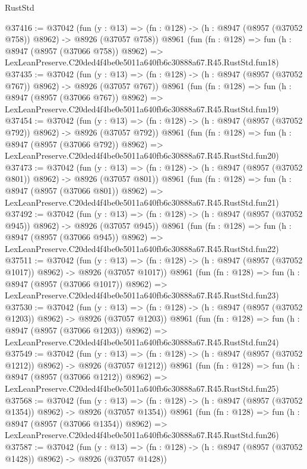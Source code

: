 \begin{lexlean}{RustStd}
\begin{coremodule}
@37416 := @37042
    (fun (y : @13) => (fn : @128) -> (h : @8947 (@8957 (@37052 @758)) @8962) -> @8926 (@37057 @758))
    @8961
    (fun (fn : @128) =>
    fun (h : @8947 (@8957 (@37066 @758)) @8962) =>
    LexLeanPreserve.C20ded4f4be0e5011a640fb6c30888a67.R45.RustStd.fun18)
@37435 := @37042
    (fun (y : @13) => (fn : @128) -> (h : @8947 (@8957 (@37052 @767)) @8962) -> @8926 (@37057 @767))
    @8961
    (fun (fn : @128) =>
    fun (h : @8947 (@8957 (@37066 @767)) @8962) =>
    LexLeanPreserve.C20ded4f4be0e5011a640fb6c30888a67.R45.RustStd.fun19)
@37454 := @37042
    (fun (y : @13) => (fn : @128) -> (h : @8947 (@8957 (@37052 @792)) @8962) -> @8926 (@37057 @792))
    @8961
    (fun (fn : @128) =>
    fun (h : @8947 (@8957 (@37066 @792)) @8962) =>
    LexLeanPreserve.C20ded4f4be0e5011a640fb6c30888a67.R45.RustStd.fun20)
@37473 := @37042
    (fun (y : @13) => (fn : @128) -> (h : @8947 (@8957 (@37052 @801)) @8962) -> @8926 (@37057 @801))
    @8961
    (fun (fn : @128) =>
    fun (h : @8947 (@8957 (@37066 @801)) @8962) =>
    LexLeanPreserve.C20ded4f4be0e5011a640fb6c30888a67.R45.RustStd.fun21)
@37492 := @37042
    (fun (y : @13) => (fn : @128) -> (h : @8947 (@8957 (@37052 @945)) @8962) -> @8926 (@37057 @945))
    @8961
    (fun (fn : @128) =>
    fun (h : @8947 (@8957 (@37066 @945)) @8962) =>
    LexLeanPreserve.C20ded4f4be0e5011a640fb6c30888a67.R45.RustStd.fun22)
@37511 := @37042
    (fun (y : @13) =>
    (fn : @128) -> (h : @8947 (@8957 (@37052 @1017)) @8962) -> @8926 (@37057 @1017))
    @8961
    (fun (fn : @128) =>
    fun (h : @8947 (@8957 (@37066 @1017)) @8962) =>
    LexLeanPreserve.C20ded4f4be0e5011a640fb6c30888a67.R45.RustStd.fun23)
@37530 := @37042
    (fun (y : @13) =>
    (fn : @128) -> (h : @8947 (@8957 (@37052 @1203)) @8962) -> @8926 (@37057 @1203))
    @8961
    (fun (fn : @128) =>
    fun (h : @8947 (@8957 (@37066 @1203)) @8962) =>
    LexLeanPreserve.C20ded4f4be0e5011a640fb6c30888a67.R45.RustStd.fun24)
@37549 := @37042
    (fun (y : @13) =>
    (fn : @128) -> (h : @8947 (@8957 (@37052 @1212)) @8962) -> @8926 (@37057 @1212))
    @8961
    (fun (fn : @128) =>
    fun (h : @8947 (@8957 (@37066 @1212)) @8962) =>
    LexLeanPreserve.C20ded4f4be0e5011a640fb6c30888a67.R45.RustStd.fun25)
@37568 := @37042
    (fun (y : @13) =>
    (fn : @128) -> (h : @8947 (@8957 (@37052 @1354)) @8962) -> @8926 (@37057 @1354))
    @8961
    (fun (fn : @128) =>
    fun (h : @8947 (@8957 (@37066 @1354)) @8962) =>
    LexLeanPreserve.C20ded4f4be0e5011a640fb6c30888a67.R45.RustStd.fun26)
@37587 := @37042
    (fun (y : @13) =>
    (fn : @128) -> (h : @8947 (@8957 (@37052 @1428)) @8962) -> @8926 (@37057 @1428))

\end{coremodule}
\end{lexlean}

